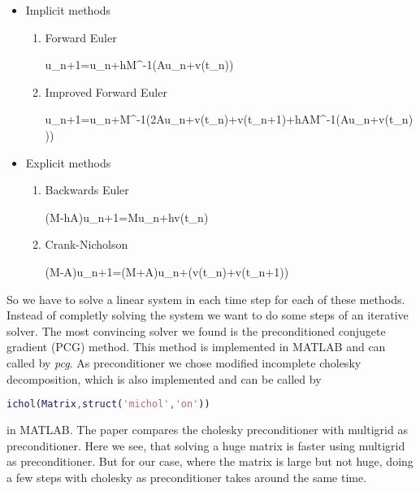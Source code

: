 \begin{itemize}
	\item Implicit methods
	\begin{enumerate}[label=\arabic*.)]
		\item Forward Euler
		\begin{flalign*}
			u_{n+1}=u_n+hM^{-1}(Au_n+v(t_n))
		\end{flalign*}
		\item Improved Forward Euler
		\begin{flalign*}
			u_{n+1}=u_n+M^{-1}\left(2Au_n+v(t_n)+v(t_{n+1})+hA\cdot M^{-1}\left(Au_n+v(t_n)\right)\right)
		\end{flalign*}
	\end{enumerate}
	\item Explicit methods
	\begin{enumerate}[resume,label=\arabic*.)]
		\item Backwards Euler
		\begin{flalign*}
			(M-hA)u_{n+1}=Mu_n+hv(t_n)
		\end{flalign*}
		\item Crank-Nicholson
		\begin{flalign*}
			(M-A)u_{n+1}=(M+\frac{h}{2}A)u_n+(v(t_n)+v(t_{n+1}))
		\end{flalign*}
	\end{enumerate}
\end{itemize}
So we have to solve a linear system in each time step for each of these methods. Instead of completly solving the system we want to do some steps of an iterative solver. The most convincing solver we found is the preconditioned conjugete gradient (PCG) method. This method is implemented in MATLAB and can called by \emph{pcg}. As preconditioner we chose modified incomplete cholesky decomposition, which is also implemented and can be called by
\begin{lstlisting}[language=matlab]
	ichol(Matrix,struct('michol','on'))
\end{lstlisting}
in MATLAB. The paper \cite{tatebe1993multigrid} compares the cholesky preconditioner with multigrid as preconditioner. Here we see, that solving a huge matrix is faster using multigrid as preconditioner. But for our case, where the matrix is large but not huge, doing a few steps with cholesky as preconditioner takes around the same time.
